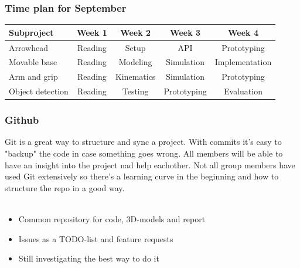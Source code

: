 \documentclass{beamer}
\begin{document}
\begin{frame}
    \frametitle{Time plan for September}
    \begin{table}
        \begin{tabular}{l | c | c | c | c }
        Subproject & Week 1 & Week 2 & Week 3 & Week 4 \\
        \hline \hline
            Arrowhead & Reading& Setup & API & Prototyping\\
            Movable base & Reading& Modeling & Simulation & Implementation\\
            Arm and grip  & Reading & Kinematics & Simulation& Prototyping\\
            Object detection & Reading & Testing & Prototyping & Evaluation\\
        \end{tabular}
    \end{table}
\end{frame}

\begin{frame}
    \frametitle{Github}
    Git is a great way to structure and sync a project. With commits it's easy to 
    "backup" the code in case something goes wrong. All members will be able to 
    have an insight into the project nad help eachother. Not all group members
    have used Git extensively so there's a learning curve in the beginning and how 
    to structure the repo in a good way. 
    \\~\
    \begin{itemize}
        \item Common repository for code, 3D-models and report
        \item Issues as a TODO-list and feature requests
        \item Still investigating the best way to do it
    \end{itemize}
\end{frame}

\end{document}
